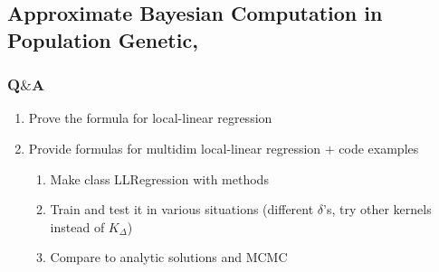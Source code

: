\subsection{Approximate Bayesian Computation in Population Genetic, \cite{abcinpopulationgenetics}}

\subsubsection*{Q$\&$A}

\begin{enumerate}

    \item Prove the formula for local-linear regression
    \item Provide formulas for multidim local-linear regression + code examples
        \begin{enumerate}
            \item Make class LLRegression with methods
            \item Train and test it in various situations (different $\delta$'s, try other kernels instead of $K_\Delta$)
            \item Compare to analytic solutions and MCMC 
        \end{enumerate}

\end{enumerate}